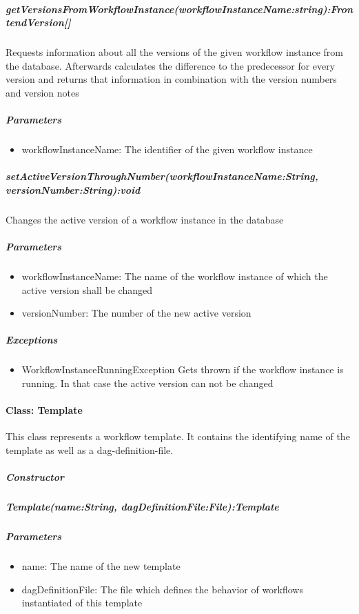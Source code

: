 \subparagraph{getVersionsFromWorkflowInstance(workflowInstanceName:string):FrontendVersion[]}
Requests information about all the versions of the given workflow instance from the database. Afterwards calculates the difference to the predecessor for every version and returns that information in combination with the version numbers and version notes

\subparagraph{Parameters}
\begin{itemize}
	\item{workflowInstanceName:}
	The identifier of the given workflow instance
\end{itemize}

\subparagraph{setActiveVersionThroughNumber(workflowInstanceName:String, versionNumber:String):void}
Changes the active version of a workflow instance in the database

\subparagraph{Parameters}
\begin{itemize}
	\item{workflowInstanceName:}
	The name of the workflow instance of which the active version shall be changed
	\item{versionNumber:}
	The number of the new active version
\end{itemize}

\subparagraph{Exceptions}
\begin{itemize}
	\item{WorkflowInstanceRunningException}
	Gets thrown if the workflow instance is running. In that case the active version can not be changed
\end{itemize}

\paragraph{Class: Template}
This class represents a workflow template. It contains the identifying name of the template as well as a dag-definition-file.
\subparagraph{Constructor}

\subparagraph{Template(name:String, dagDefinitionFile:File):Template}

\subparagraph{Parameters}
\begin{itemize}
	\item{name:}
	The name of the new template
	\item{dagDefinitionFile:}
	The file which defines the behavior of workflows instantiated of this template
\end{itemize}

